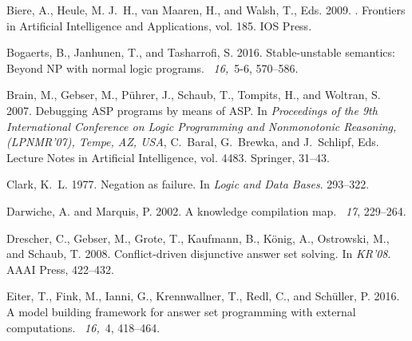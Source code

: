 \begin{thebibliography}{}

{\sc Biere, A.}, {\sc Heule, M. J.~H.}, {\sc van Maaren, H.}, {\sc and} {\sc
  Walsh, T.}, Eds. 2009.
. Frontiers in Artificial
  Intelligence and Applications, vol. 185.
\newblock IOS Press.

{\sc Bogaerts, B.}, {\sc Janhunen, T.}, {\sc and} {\sc Tasharrofi, S.} 2016.
\newblock Stable-unstable semantics: Beyond {NP} with normal logic programs.
~{\em 16,\/}~5-6, 570--586.

{\sc Brain, M.}, {\sc Gebser, M.}, {\sc P{\"u}hrer, J.}, {\sc Schaub, T.}, {\sc
  Tompits, H.}, {\sc and} {\sc Woltran, S.} 2007.
\newblock Debugging {ASP} programs by means of {ASP}.
\newblock In {\em Proceedings of the 9th International Conference on Logic
  Programming and Nonmonotonic Reasoning, (LPNMR'07), Tempe, AZ, USA},
  {C.~Baral}, {G.~Brewka}, {and} {J.~Schlipf}, Eds. Lecture Notes in Artificial
  Intelligence, vol. 4483. Springer, 31--43.

{\sc Clark, K.~L.} 1977.
\newblock Negation as failure.
\newblock In {\em Logic and Data Bases}. 293--322.

{\sc Darwiche, A.} {\sc and} {\sc Marquis, P.} 2002.
\newblock A knowledge compilation map.
~{\em 17}, 229--264.

{\sc Drescher, C.}, {\sc Gebser, M.}, {\sc Grote, T.}, {\sc Kaufmann, B.}, {\sc
  K\"{o}nig, A.}, {\sc Ostrowski, M.}, {\sc and} {\sc Schaub, T.} 2008.
\newblock Conflict-driven disjunctive answer set solving.
\newblock In {\em KR'08}. AAAI Press, 422--432.

{\sc Eiter, T.}, {\sc Fink, M.}, {\sc Ianni, G.}, {\sc Krennwallner, T.}, {\sc
  Redl, C.}, {\sc and} {\sc Sch\"{u}ller, P.} 2016.
\newblock A model building framework for answer set programming with external
  computations.
~{\em 16,\/}~4,
  418--464.


\end{thebibliography}
